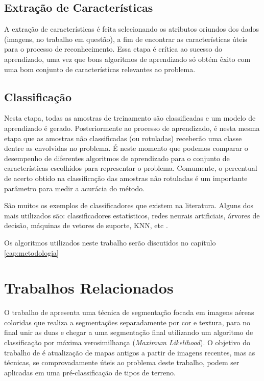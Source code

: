 \subsection{Extração de Características}

A extração de características é feita selecionando os atributos oriundos dos dados (imagens, no trabalho em questão), a fim de encontrar as características úteis para o processo de reconhecimento. Essa etapa é crítica ao sucesso do aprendizado, uma vez que bons algoritmos de aprendizado só obtém êxito com uma bom conjunto de características relevantes ao problema.

\subsection{Classificação}

Nesta etapa, todas as amostras de treinamento são classificadas e um modelo de aprendizado é gerado. Posteriormente ao processo de aprendizado, é nesta mesma etapa que as amostras não classificadas (ou rotuladas) receberão uma classe dentre as envolvidas no problema. É neste momento que podemos comparar o desempenho de diferentes algoritmos de aprendizado para o conjunto de características escolhidos para representar o problema. Comumente, o percentual de acerto obtido na classificação das amostras não rotuladas é um importante parâmetro para medir a acurácia do método.

São muitos os exemplos de classificadores que existem na literatura. Alguns dos mais utilizados são: classificadores estatísticos, redes neurais artificiais, árvores de decisão, máquinas de vetores de suporte, KNN, etc \cite{jain:1989}.

Os algoritmos utilizados neste trabalho serão discutidos no capítulo \ref{cap:metodologia}

\section{Trabalhos Relacionados}

O trabalho de \cite{dubuisson:2000} apresenta uma técnica de segmentação focada em imagens aéreas coloridas que realiza a segmentações separadamente por cor e textura, para no final unir as duas e chegar a uma segmentação final utilizando um algoritmo de classificação por máxima verosimilhança (\textit{Maximum Likelihood}). O objetivo do trabalho de \cite{dubuisson:2000} é atualização de mapas antigos a partir de imagens recentes, mas as técnicas, se comprovadamente úteis ao problema deste trabalho, podem ser aplicadas em uma pré-classificação de tipos de terreno.

